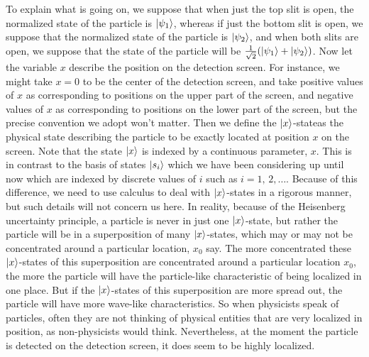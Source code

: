     To explain what is going on, we suppose that when just the top slit is open, the normalized state of the particle is $\ket{\psi_1}$,\label{psi_slit} whereas if just the bottom slit is open, we suppose that the normalized state of the particle is $\ket{\psi_2}$, and when both slits are open, we suppose that the state of the particle will be $\frac{1}{\sqrt{2}}(\ket{\psi_1}+\ket{\psi_2})$. 
     Now let the variable $x$ describe the position on the detection screen. For instance, we might take $x=0$ to be the center of the detection screen, and take  positive values of $x$ as corresponding to positions on the upper part of the screen, and negative values of $x$ as corresponding to positions on the lower part of the screen, but the precise convention we adopt won't matter. Then we define the  $\ket{x}$-state\footnotemark\;as the physical state describing the particle to be exactly located at position $x$ on the screen. Note that the state $\ket{x}$ is indexed by a continuous parameter, $x$. This is in contrast to the basis of states $\ket{s_i}$ which we have been considering up until now which are indexed by discrete values of $i$ such as $i=1,\,2,\ldots.$ Because of this difference, we need to use calculus to deal with $\ket{x}$-states in a rigorous manner, but such details will not concern us here. In reality, because of the Heisenberg uncertainty principle, a particle is never in just one $\ket{x}$-state, but rather the particle will be in a superposition of many $\ket{x}$-states, which may or may not be concentrated around a particular location, $x_0$ say. The more concentrated these  $\ket{x}$-states of this superposition are concentrated around a particular location $x_0$, the more the particle will have the particle-like characteristic of being localized in one place. But if the  $\ket{x}$-states of this superposition are more spread out, the particle will have more wave-like characteristics. So when physicists speak of particles, often they are not thinking of physical entities that are very localized in position, as non-physicists would think. Nevertheless, at the moment the particle is detected on the detection screen, it does seem to be highly localized.
